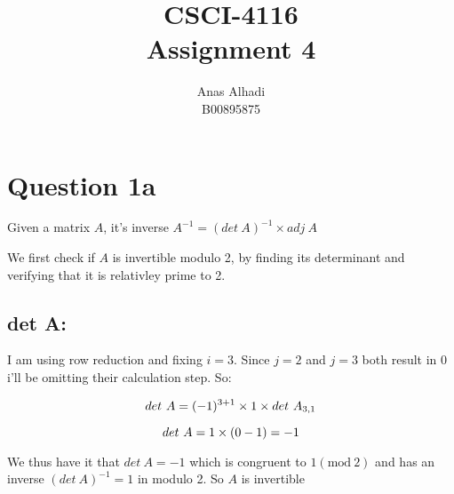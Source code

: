 \documentclass{article}
\title{\textbf{CSCI-4116\\Assignment 4}}
\author{Anas Alhadi\\B00895875}
\numberwithin{equation}{subsection}
\begin{document}
	\maketitle

	

	\vspace{25pt}
	\section*{Question 1a}

	\vspace{10pt}
	\par{
		Given a matrix $A$, it's inverse $A^{-1} = (det \ A)^{-1} \times adj \ A$
	}

	\par{
		We first check if $A$ is invertible modulo 2, by finding its determinant and verifying
		that it is relativley prime to 2.
	}


	\vspace{10pt}
	\subsection*{det A:}
	\begin{adjustwidth}{2em}{2em}
		\par{
			I am using row reduction and fixing $i=3$. Since $j=2$ and $j=3$ both result
			in $0$ i'll be omitting their calculation step. So:
		}	

		\begin{equation}\notag 
			det \ A = (-1)^{3+1} \times 1 \times det \ A_{3,1}
		\end{equation}

		\begin{equation}\notag
			det \ A = 1 \times (0-1) = -1
		\end{equation}
		
		\par{
			We thus have it that $det\ A = -1$ which is congruent to $1 (\textrm{mod}\ 2)$ and has 
			an inverse $(det\ A )^{-1} = 1$ in modulo 2. So $A$ is invertible
		}
	\end{adjustwidth}

	\newpage
	\thispagestyle{fancy}
\end{document}
